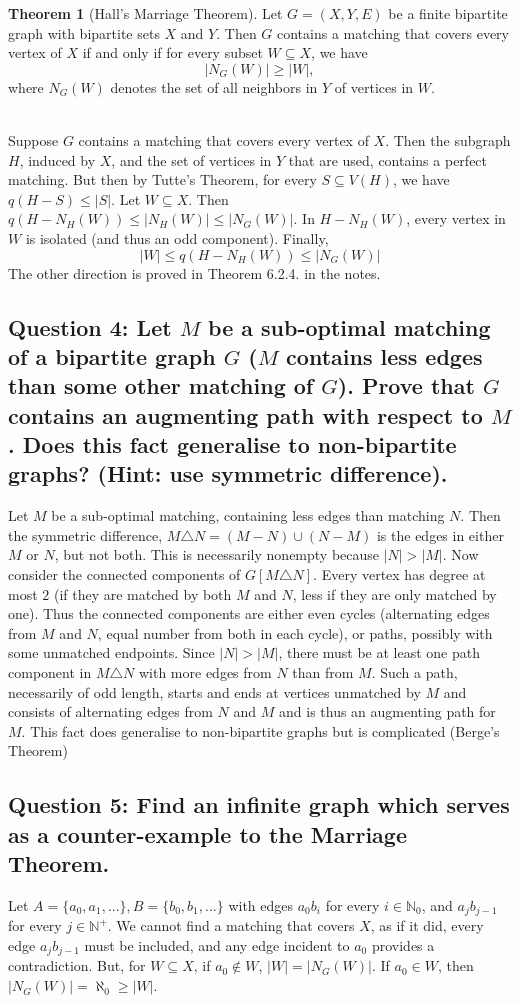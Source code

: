 \documentclass[letterpaper, 11pt]{article}
\newcommand{\1}{\mathds{1}}	%
\theoremstyle{definition}
\newtheorem{theorem}{Theorem}[section]
\begin{document}
\begin{theorem}[Hall's Marriage Theorem]
Let $G = (X, Y, E)$ be a finite bipartite graph with bipartite sets $X$ and $Y$. Then $G$ contains a matching that covers every vertex of $X$ if and only if for every subset $W \subseteq X$, we have
\[
|N_G(W)| \geq |W|,
\]
where $N_G(W)$ denotes the set of all neighbors in $Y$ of vertices in $W$.
\end{theorem}
~\\
Suppose $G$ contains a matching that covers every vertex of $X$. Then the subgraph $H$, induced by $X$, and the set of vertices in $Y$ that are used, contains a perfect matching. But then by Tutte's Theorem, for every $S \subseteq V(H)$, we have $q(H - S) \le |S|$. Let $W \subseteq X$. Then $q(H - N_H(W)) \le |N_H(W)| \le |N_G(W)|$. In $H - N_H(W)$, every vertex in $W$ is isolated (and thus an odd component). Finally, \[|W| \le q(H - N_H(W)) \le |N_G(W)|\]The other direction is proved in Theorem 6.2.4. in the notes.


\subsection*{Question 4: Let $M$ be a sub-optimal matching of a bipartite graph $G$ ($M$ contains less edges than
some other matching of $G$). Prove that $G$ contains an augmenting path with respect
to $M$. Does this fact generalise to non-bipartite graphs? (Hint: use symmetric
difference).}
Let $M$ be a sub-optimal matching, containing less edges than matching $N$. Then the symmetric difference, $M \triangle N = (M - N) \cup (N - M)$ is the edges in either $M$ or $N$, but not both. This is necessarily nonempty because $|N| > |M|$. Now consider the connected components of $G[M \triangle N]$. Every vertex has degree at most $2$ (if they are matched by both $M$ and $N$, less if they are only matched by one). Thus the connected components are either even cycles (alternating edges from $M$ and $N$, equal number from both in each cycle), or paths, possibly with some unmatched endpoints. Since $|N| > |M|$, there must be at least one path component in $M \triangle N$ with more edges from $N$ than from $M$. Such a path, necessarily of odd length, starts and ends at vertices unmatched by $M$ and consists of alternating edges from $N$ and $M$ and is thus an augmenting path for $M$. This fact does generalise to non-bipartite graphs but is complicated (Berge's Theorem)

\subsection*{Question 5: Find an infinite graph which serves as a counter-example to the Marriage Theorem.}
Let $A = \{a_0,a_1,...\}, B = \{b_0, b_1,...\}$ with edges $a_0b_i$ for every $i \in \mathbb{N}_0$, and $a_jb_{j-1}$ for every $j \in \mathbb{N}^+$. We cannot find a matching that covers $X$, as if it did, every edge $a_j b_{j-1}$ must be included, and any edge incident to $a_0$ provides a contradiction. But, for $W \subseteq X$, if $a_0 \notin W$, $|W| = |N_G(W)|$. If $a_0 \in W$, then $|N_G(W)| = \aleph_0 \ge |W|$.
\end{document}
